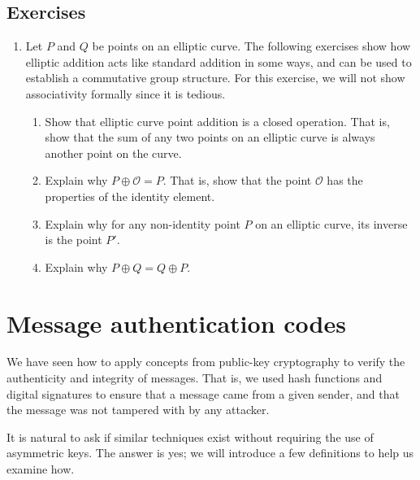 \documentclass{book}
\theoremstyle{plain}
\theoremstyle{definition}
\newif\ifprintsolutions
\newcommand{\solution}[1]{\ifprintsolutions \begin{sloppypar}{\it #1}\end{sloppypar} \fi} %
\begin{document}
\section{Exercises}
\begin{enumerate}
\item Let $P$ and $Q$ be points on an elliptic curve. The following exercises show how elliptic addition acts like standard addition in some ways, and can be used to establish a commutative group structure. For this exercise, we will not show associativity formally since it is tedious.
\begin{enumerate}
\item Show that elliptic curve point addition is a closed operation. That is, show that the sum of any two points on an elliptic curve is always another point on the curve.
\item Explain why $P \oplus \mathcal{O} = P$. That is, show that the point $\mathcal{O}$ has the properties of the identity element. \solution{The intersecting point on the curve is $P'$ which, when reflected according to the algorithm, gives $P$ again.}
\item Explain why for any non-identity point $P$ on an elliptic curve, its inverse is the point $P'$. \solution{The line connecting $P$ and $P'$ intersects the point at infinity $\mathcal{O}$, which is the identity.}
\item Explain why $P \oplus Q = Q \oplus  P$. \solution{If neither point is the point at infinity, then the line connecting $P$ to $Q$ is the same as the line connecting $Q$ to $P$, so the sums are the same. If one point (say $Q$) is the point at infinity, then by definition we have $P \oplus \mathcal{O} = \mathcal{O} \oplus P$.}
\end{enumerate}
\end{enumerate}

\chapter{Message authentication codes}
We have seen how to apply concepts from public-key cryptography to verify the authenticity and integrity of messages. That is, we used hash functions and digital signatures to ensure that a message came from a given sender, and that the message was not tampered with by any attacker.

It is natural to ask if similar techniques exist without requiring the use of asymmetric keys. The answer is yes; we will introduce a few definitions to help us examine how.
\end{document}
